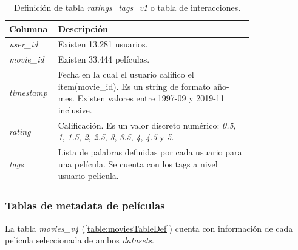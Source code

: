 \documentclass[11pt,a4paper,twoside]{thesis}
\begin{document}
\begin{table}[!htb]
	\centering
	\footnotesize
	\begin{tabular}{l | p{0.8\linewidth}}
	\hline
		Columna        & Descripción \\
	\hline

	\textit{user\_id}  & Existen 13.281 usuarios. \\
	\textit{movie\_id} & Existen 33.444 películas. \\
	\textit{timestamp} & Fecha en la cual el usuario califico el item(movie\_id). Es un string de formato año-mes. Existen valores entre 1997-09 y 2019-11 inclusive. \\
	\textit{rating}    & Calificación. Es un valor discreto numérico: \textit{0.5}, \textit{1}, \textit{1.5}, \textit{2}, \textit{2.5}, \textit{3}, \textit{3.5}, \textit{4}, \textit{4.5} y \textit{5}. \\
	\textit{tags}      & Lista de palabras definidas por cada usuario para una película. Se cuenta con los tags a nivel usuario-película. \\
	\hline
	\end{tabular}
	\caption{
		Definición de tabla \textit{ratings\_tags\_v1} o tabla de interacciones.
	}
	\label{table:interactionsTableDef}
\end{table}

\clearpage
\subsubsection*{Tablas de metadata de películas}

La tabla \textit{movies\_v4} (\ref{table:moviesTableDef}) cuenta con información de cada película seleccionada de ambos \textit{datasets}. 
\end{document}
